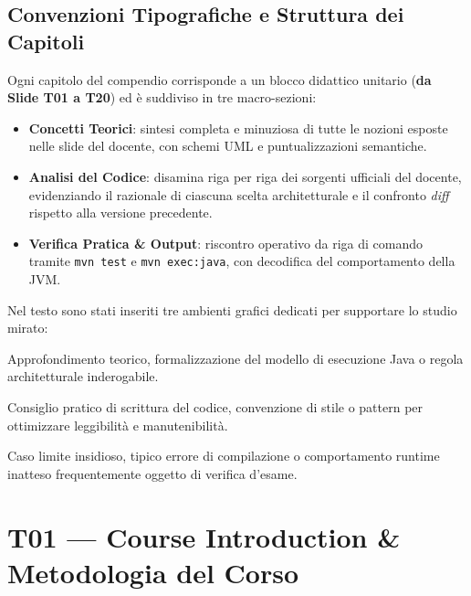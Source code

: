 \documentclass[11pt,a4paper,oneside]{report}
\begin{document}
\section*{Convenzioni Tipografiche e Struttura dei Capitoli}
Ogni capitolo del compendio corrisponde a un blocco didattico unitario (\textbf{da Slide T01 a T20}) ed è suddiviso in tre macro-sezioni:
\begin{itemize}
  \item \textbf{Concetti Teorici}: sintesi completa e minuziosa di tutte le nozioni esposte nelle slide del docente, con schemi UML e puntualizzazioni semantiche.
  \item \textbf{Analisi del Codice}: disamina riga per riga dei sorgenti ufficiali del docente, evidenziando il razionale di ciascuna scelta architetturale e il confronto \emph{diff} rispetto alla versione precedente.
  \item \textbf{Verifica Pratica \& Output}: riscontro operativo da riga di comando tramite \texttt{mvn test} e \texttt{mvn exec:java}, con decodifica del comportamento della JVM.
\end{itemize}

Nel testo sono stati inseriti tre ambienti grafici dedicati per supportare lo studio mirato:
\begin{studynote}
Approfondimento teorico, formalizzazione del modello di esecuzione Java o regola architetturale inderogabile.
\end{studynote}

\begin{studytip}
Consiglio pratico di scrittura del codice, convenzione di stile o pattern per ottimizzare leggibilità e manutenibilità.
\end{studytip}

\begin{studywarning}
Caso limite insidioso, tipico errore di compilazione o comportamento runtime inatteso frequentemente oggetto di verifica d'esame.
\end{studywarning}

\newpage

\renewcommand{\contentsname}{Indice Generale}
\tableofcontents
\newpage

\setcounter{page}{1}

\chapter[T01 --- Course Introduction]{T01 --- Course Introduction \& Metodologia del Corso}
\label{chap:t01}
\end{document}
